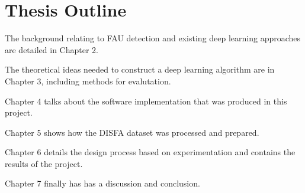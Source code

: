   \section{Thesis Outline}
    The background relating to FAU detection and existing deep learning approaches
    are detailed in Chapter 2.

    The theoretical ideas needed to construct a deep learning algorithm are in
    Chapter 3, including methods for evalutation.

    Chapter 4 talks about the software implementation that was produced in this project.

    Chapter 5 shows how the DISFA dataset was processed and prepared.

    Chapter 6 details the design process based on experimentation and contains
    the results of the project.

    Chapter 7 finally has has a discussion and conclusion.
